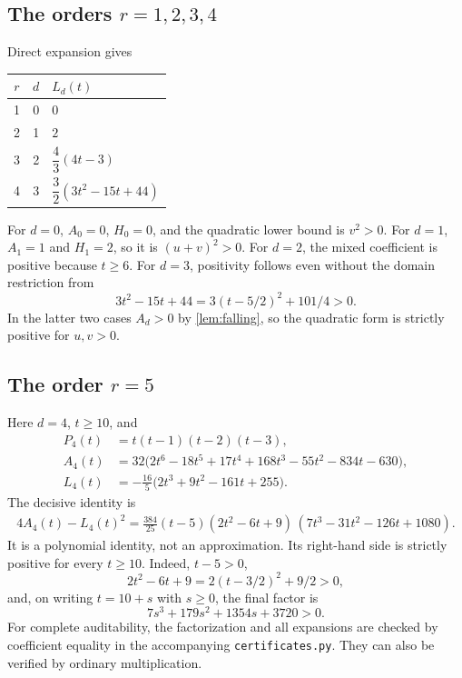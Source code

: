 \documentclass[11pt,a4paper]{article}
\numberwithin{equation}{section}
\theoremstyle{definition}
\theoremstyle{remark}
\begin{document}
\subsection{The orders $r=1,2,3,4$}

Direct expansion gives
\begin{center}
\renewcommand{\arraystretch}{1.45}
\begin{tabular}{ccl}
\toprule
$r$ & $d$ & $L_d(t)$\\
\midrule
1 & 0 & $0$\\
2 & 1 & $2$\\
3 & 2 & $\dfrac43(4t-3)$\\
4 & 3 & $\dfrac32(3t^2-15t+44)$\\
\bottomrule
\end{tabular}
\end{center}
For $d=0$, $A_0=0$, $H_0=0$, and the quadratic lower bound is $v^2>0$.
For $d=1$, $A_1=1$ and $H_1=2$, so it is $(u+v)^2>0$.
For $d=2$, the mixed coefficient is positive because $t\ge6$.
For $d=3$, positivity follows even without the domain restriction from
\[
 3t^2-15t+44=3(t-5/2)^2+101/4>0.
\]
In the latter two cases $A_d>0$ by \cref{lem:falling}, so the quadratic
form is strictly positive for $u,v>0$.

\subsection{The order $r=5$}

Here $d=4$, $t\ge10$, and
\begin{align}
 P_4(t)&=t(t-1)(t-2)(t-3),\label{eq:P4}\\
 A_4(t)&=32\bigl(2t^6-18t^5+17t^4+168t^3
                      -55t^2-834t-630\bigr),\label{eq:A4}\\
 L_4(t)&=-\frac{16}{5}\bigl(2t^3+9t^2-161t+255\bigr).
                                                       \label{eq:L4}
\end{align}
The decisive identity is
\begin{equation}\label{eq:main-factor}
\boxed{\begin{aligned}
 4A_4(t)-L_4(t)^2
   =\frac{384}{25}(t-5)(2t^2-6t+9)\,
                    (7t^3-31t^2-126t+1080).
\end{aligned}}
\end{equation}
It is a polynomial identity, not an approximation. Its right-hand side is
strictly positive for every $t\ge10$. Indeed, $t-5>0$,
\[
 2t^2-6t+9=2(t-3/2)^2+9/2>0,
\]
and, on writing $t=10+s$ with $s\ge0$, the final factor is
\begin{equation}\label{eq:positive-cubic}
 7s^3+179s^2+1354s+3720>0.
\end{equation}
For complete auditability, the factorization and all expansions are
checked by coefficient equality in the accompanying \texttt{certificates.py}.
They can also be verified by ordinary multiplication.
\end{document}
